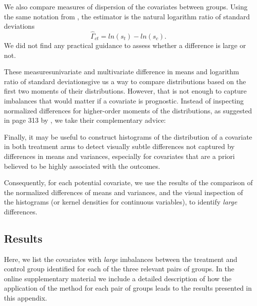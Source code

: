 We also compare measures of dispersion of the covariates between groups. Using the same notation from \citet{imbensCausalInferenceStatistics2015}, the estimator is the natural logarithm ratio of standard deviations
\begin{equation*}
  \hat{\Gamma}_{ct}=ln(s_t)-ln(s_c).
\end{equation*}
We did not find any practical guidance to assess whether a difference is large or not.

These measures\textemdash univariate and multivariate difference in means and logarithm ratio of standard deviations\textemdash give us a way to compare distributions based on the first two moments of their distributions. However, that is not enough to capture imbalances that would matter if a covariate is prognostic. Instead of inspecting normalized differences for higher-order moments of the distributions, as suggested in page 313 by \citet{imbensCausalInferenceStatistics2015}, we take their complementary advice:

\begin{displayquote}
  Finally, it may be useful to construct histograms of the distribution of a covariate in both treatment arms to detect visually subtle differences not captured by differences in means and variances, especially for covariates that are a priori believed to be highly associated with the outcomes.
\end{displayquote}

Consequently, for each potential covariate, we use the results of the comparison of the normalized differences of means and variances, and the visual inspection of the histograms (or kernel densities for continuous variables), to identify \emph{large} differences.

\subsection{Results}

Here, we list the covariates with \emph{large} imbalances between the treatment and control group identified for each of the three relevant pairs of groups. In the online supplementary material we include a detailed description of how the application of the method for each pair of groups leads to the results presented in this appendix.

